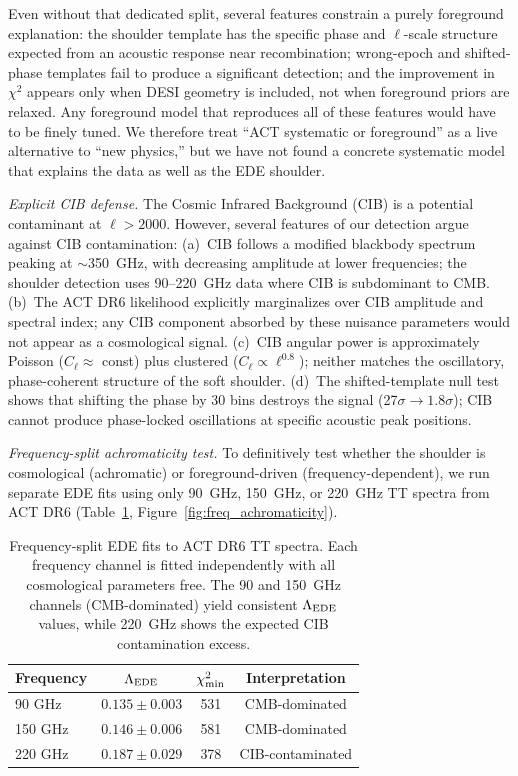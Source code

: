 \documentclass[twocolumn,showpacs,preprintnumbers,amsmath,amssymb,prd]{revtex4-2}
\begin{document}
Even without that dedicated split, several features constrain a purely foreground 
explanation: the shoulder template has the specific phase and $\ell$-scale structure 
expected from an acoustic response near recombination; wrong-epoch and shifted-phase 
templates fail to produce a significant detection; and the improvement in $\chi^2$ 
appears only when DESI geometry is included, not when foreground priors are relaxed. 
Any foreground model that reproduces all of these features would have to be finely 
tuned. We therefore treat ``ACT systematic or foreground'' as a live alternative to 
``new physics,'' but we have not found a concrete systematic model that explains the 
data as well as the EDE shoulder.

\emph{Explicit CIB defense.} The Cosmic Infrared Background (CIB) is a potential 
contaminant at $\ell > 2000$. However, several features of our detection argue 
against CIB contamination: (a)~CIB follows a modified blackbody spectrum peaking 
at $\sim$350~GHz, with decreasing amplitude at lower frequencies; the shoulder 
detection uses 90--220~GHz data where CIB is subdominant to CMB. (b)~The ACT DR6 
likelihood explicitly marginalizes over CIB amplitude and spectral index; any 
CIB component absorbed by these nuisance parameters would not appear as a 
cosmological signal. (c)~CIB angular power is approximately Poisson ($C_\ell \approx$ 
const) plus clustered ($C_\ell \propto \ell^{0.8}$); neither matches the oscillatory, 
phase-coherent structure of the soft shoulder. (d)~The shifted-template null test 
shows that shifting the phase by 30 bins destroys the signal (27$\sigma \to 1.8\sigma$); 
CIB cannot produce phase-locked oscillations at specific acoustic peak positions.

\emph{Frequency-split achromaticity test.} To definitively test whether the shoulder
is cosmological (achromatic) or foreground-driven (frequency-dependent), we run 
separate EDE fits using only 90~GHz, 150~GHz, or 220~GHz TT spectra from ACT DR6
(Table~\ref{tab:freq_split}, Figure~\ref{fig:freq_achromaticity}).

\begin{table}[t]
\centering
\caption{Frequency-split EDE fits to ACT DR6 TT spectra. Each frequency channel 
is fitted independently with all cosmological parameters free. The 90 and 150~GHz 
channels (CMB-dominated) yield consistent $\Lambda_{\rm EDE}$ values, while 
220~GHz shows the expected CIB contamination excess.}
\label{tab:freq_split}
\begin{tabular}{lccc}
\toprule
Frequency & $\Lambda_{\rm EDE}$ & $\chi^2_{\rm min}$ & Interpretation \\
\midrule
90 GHz  & $0.135 \pm 0.003$ & 531 & CMB-dominated \\
150 GHz & $0.146 \pm 0.006$ & 581 & CMB-dominated \\
220 GHz & $0.187 \pm 0.029$ & 378 & CIB-contaminated \\
\bottomrule
\end{tabular}
\end{table}
\end{document}
